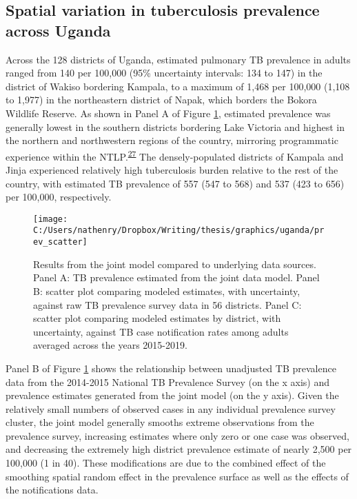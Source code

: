 \documentclass[
]{article}
\begin{document}
\hypertarget{spatial-variation-in-tuberculosis-prevalence-across-uganda}{%
\subsection{Spatial variation in tuberculosis prevalence across Uganda}\label{spatial-variation-in-tuberculosis-prevalence-across-uganda}}

Across the 128 districts of Uganda, estimated pulmonary TB prevalence in adults ranged from 140 per 100,000 (95\% uncertainty intervals: 134 to 147) in the district of Wakiso bordering Kampala, to a maximum of 1,468 per 100,000 (1,108 to 1,977) in the northeastern district of Napak, which borders the Bokora Wildlife Reserve. As shown in Panel A of Figure \ref{fig:prev-scatter}, estimated prevalence was generally lowest in the southern districts bordering Lake Victoria and highest in the northern and northwestern regions of the country, mirroring programmatic experience within the NTLP.\textsuperscript{\protect\hyperlink{ref-UgandaNationalTuberculosisandLeprosyProgramme2020a}{27}} The densely-populated districts of Kampala and Jinja experienced relatively high tuberculosis burden relative to the rest of the country, with estimated TB prevalence of 557 (547 to 568) and 537 (423 to 656) per 100,000, respectively.

\begin{figure}[!ht]

{\centering \texttt{[image: C:/Users/nathenry/Dropbox/Writing/thesis/graphics/uganda/prev\_scatter]} 

}

\caption{Results from the joint model compared to underlying data sources. Panel A: TB prevalence estimated from the joint data model. Panel B: scatter plot comparing modeled estimates, with uncertainty, against raw TB prevalence survey data in 56 districts. Panel C: scatter plot comparing modeled estimates by district, with uncertainty, against TB case notification rates among adults averaged across the years 2015-2019.}\label{fig:prev-scatter}
\end{figure}

Panel B of Figure \ref{fig:prev-scatter} shows the relationship between unadjusted TB prevalence data from the 2014-2015 National TB Prevalence Survey (on the x axis) and prevalence estimates generated from the joint model (on the y axis). Given the relatively small numbers of observed cases in any individual prevalence survey cluster, the joint model generally smooths extreme observations from the prevalence survey, increasing estimates where only zero or one case was observed, and decreasing the extremely high district prevalence estimate of nearly 2,500 per 100,000 (1 in 40). These modifications are due to the combined effect of the smoothing spatial random effect in the prevalence surface as well as the effects of the notifications data.
\end{document}
